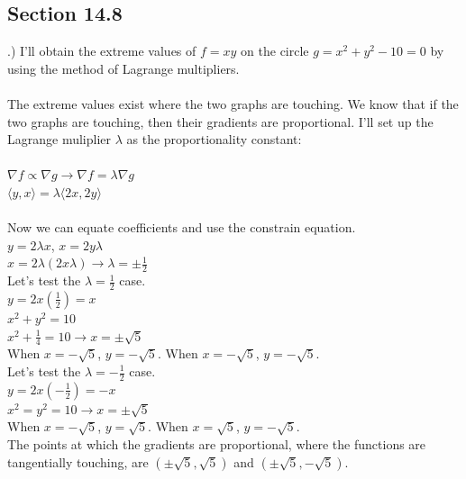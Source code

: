 \documentclass[12pt]{article}
\begin{document}
\subsection*{Section 14.8}
.) I'll obtain the extreme values of $f = xy$ on the circle $g = x^{2} + y^{2} -10 = 0$ by using the method of Lagrange multipliers.\\\\
\noindent The extreme values exist where the two graphs are touching. We know that if the two graphs are touching, then their gradients are proportional. 
I'll set up the Lagrange muliplier $\lambda$ as the proportionality constant: \\\\
\noindent $\nabla f \propto \nabla g \rightarrow \nabla f = \lambda \nabla g$\\
\noindent $ \langle y, x\rangle = \lambda \langle 2x, 2y\rangle$\\\\
\noindent Now we can equate coefficients and use the constrain equation.\\
\noindent $y = 2\lambda x$, \hspace{10pt} $x = 2y\lambda$\\
\noindent $x = 2\lambda (2x\lambda) \rightarrow \lambda = \pm \frac{1}{2}$\\
\noindent Let's test the $\lambda = \frac{1}{2}$ case.\\
\noindent $y = 2x(\frac{1}{2}) = x$\\
\noindent $x^{2} + y^{2} = 10$\\
\noindent $x^{2} + \frac{1}{4} = 10 \rightarrow x = \pm\sqrt{5}$\\
\noindent When $x = -\sqrt{5}$, $y = -\sqrt{5}$. When $x = -\sqrt{5}$, $y = -\sqrt{5}$.\\
\noindent Let's test the $\lambda = -\frac{1}{2}$ case.\\
\noindent $y = 2x(-\frac{1}{2}) = -x$\\
\noindent $x^{2} = y^{2} = 10 \rightarrow x = \pm\sqrt{5}$\\
\noindent When $x = -\sqrt{5}$, $y = \sqrt{5}$. When $x = \sqrt{5}$, $y = -\sqrt{5}$.\\
\noindent The points at which the gradients are proportional, where the functions are tangentially touching,
 are $(\pm \sqrt{5}, \sqrt{5})$ and $(\pm \sqrt{5}, -\sqrt{5})$.\\\\
\end{document}
